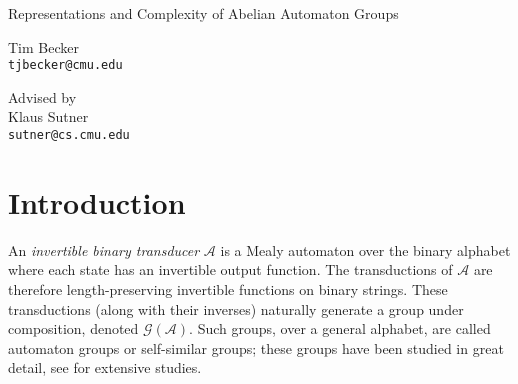 \documentclass[12pt, letterpaper]{article}
\newcommand{\A}{\mathcal A}
\newcommand{\gp}{\mathcal G}
\begin{document}
\thispagestyle{empty}
\vspace*{\fill}
\begin{center}
    {\Huge Representations and Complexity of Abelian Automaton Groups}
    \vspace{1in}

    {\Large Tim Becker\hfill\\}
    \texttt{tjbecker@cmu.edu}

    \vspace{1in}

    {\large Advised by}\\
    {\Large Klaus Sutner\hfill\\}
    \texttt{sutner@cs.cmu.edu}
\end{center}
\vspace*{\fill}

\pagebreak
\thispagestyle{empty}


\pagebreak
\thispagestyle{empty}

\tableofcontents

\pagebreak
\setcounter{page}{1}

\section{Introduction}
An \emph{invertible binary transducer} $\A$ is a Mealy automaton over the
binary alphabet where each state has an invertible output function. The
transductions of $\A$ are therefore length-preserving invertible functions on
binary strings. These transductions (along with their inverses) naturally
generate a group under composition, denoted $\gp(\A)$. Such groups, over a
general alphabet, are called automaton groups or self-similar groups; these
groups have been studied in great detail, see \cite{nekrashevych2014self,
    grigorchuk2000automata} for extensive studies.
\end{document}
